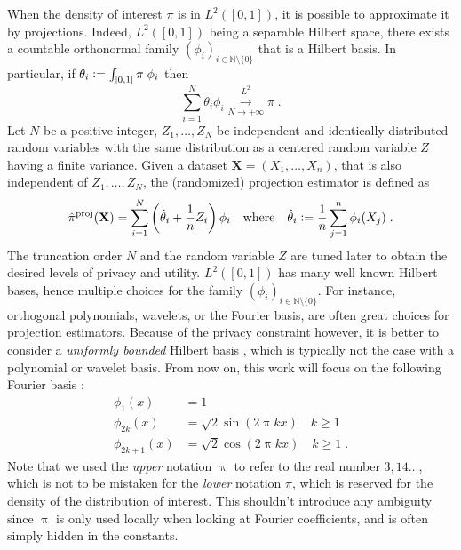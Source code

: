 \documentclass[10pt]{article} %
\newcommand{\N}[0]{\mathbb{N}}
\newcommand{\eqdef}{\vcentcolon=}
\newcommand\vect[1]{\mathbf{#1}}
\newcommand\conv[1]{\overset{}{\underset{#1}{\longrightarrow}}}
\newcommand\p[1]{\left( {#1}\right)}
\newcommand\RG[1]{\textcolor{red}{#1}}
\newcommand\mRG[1]{\marginpar{\tiny\RG{#1}}}
\newcommand\B[1]{{#1}}
\begin{document}
When the density of interest $\pi$ is in $L^2([0, 1])$, it is possible to approximate it by projections. Indeed, $L^2([0, 1])$ being a separable Hilbert space, there exists a countable orthonormal family $\p{\phi_i}_{i \in \N \setminus \{0\}}$ that is a Hilbert basis. In particular, if $\theta_i \eqdef \int_{[0, 1]} \pi\;\phi_i $ then
\begin{equation*}
    \sum_{i=1}^N \theta_i \phi_i \stackrel{L^2}{\conv{N \rightarrow +\infty}} \pi \;.
\end{equation*}
Let $N$ be a positive integer, $Z_1, \dots, Z_{N}$ be independent and identically distributed random variables with the same distribution as a centered random variable $Z$ having a finite variance. Given a dataset $\vect{X} = (X_1, \dots, X_n)$, that is also independent of $Z_1, \dots, Z_{N}$, the (randomized) projection estimator is defined as 
\begin{equation}
\label{def:projestimator}
    \hat{\pi}^{\text{proj}} (\vect{X}) = \sum_{i=1}^N \p{\hat{\theta}_i + \frac{1}{n} Z_i} \phi_i \quad \text{where} \quad \hat{\theta}_i \eqdef \frac{1}{n} \sum_{j=1}^n \phi_i(X_j)  \;.
\end{equation}%
The truncation order $N$ and the random variable $Z$ are tuned later to obtain the desired levels of privacy and utility.
$L^2([0, 1])$ has many well known Hilbert bases, hence multiple choices for the family $\p{\phi_i}_{i \in \N \setminus \{0\}}$. For instance, orthogonal polynomials, wavelets, or the Fourier basis, are often great choices for projection estimators. Because of the privacy constraint however, it is better to consider a \emph{uniformly bounded} Hilbert basis \citep{wasserman2010statistical}, which is typically not the case with a polynomial or wavelet basis. From now on, this work will focus on the following Fourier basis : 
\begin{equation*}
    \begin{aligned}
        \phi_1(x) &= 1 \\
        \phi_{2k}(x) &= \sqrt{2} \sin \p{2 \B{\uppi} k x} \quad k \geq 1 \\
        \phi_{2k + 1}(x) &= \sqrt{2} \cos \p{2 \B{\uppi} k x} \quad k \geq 1 \;.
    \end{aligned}
\end{equation*}
\B{Note that we used the \emph{upper} notation $\uppi$ to refer to the real number $3,14 \dots$, which is not to be mistaken for the \emph{lower} notation $\pi$, which is reserved for the density of the distribution of interest. This shouldn't introduce any ambiguity since $\uppi$ is only used locally when looking at Fourier coefficients, and is often simply hidden in the constants.}
\end{document}
